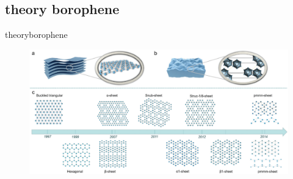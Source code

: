 \documentclass[handout,t]{beamer}
\begin{document}
\subsection{theory borophene}
\begin{frame}{theoryborophene}
	\begin{figure}
		\centering
		\includegraphics[width=\textwidth]{../figures/theory-borophene.png}
		\label{theoryborophene}
	\end{figure}
\end{frame}
\end{document}
